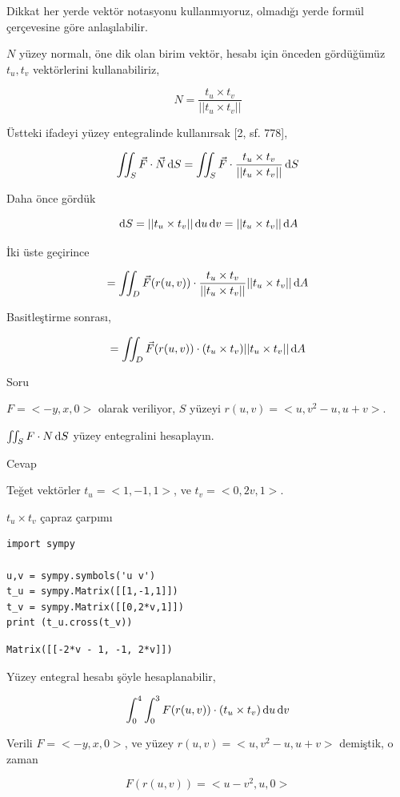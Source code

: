 \documentclass[12pt,fleqn]{article}\usepackage{../../common}
\begin{document}
Dikkat her yerde vektör notasyonu kullanmıyoruz, olmadığı yerde formül
çerçevesine göre anlaşılabilir.

$N$ yüzey normalı, öne dik olan birim vektör, hesabı için önceden gördüğümüz
$t_u,t_v$ vektörlerini kullanabiliriz,

$$
N = \frac{t_u \times t_v}{ || t_u \times t_v || }
$$

Üstteki ifadeyi yüzey entegralinde kullanırsak [2, sf. 778],

$$
\iint_S \vec{F} \cdot \vec{N} \,\mathrm{d} S =
\iint_S \vec{F} \cdot \frac{t_u \times t_v}{ || t_u \times t_v || } \,\mathrm{d} S
$$

Daha önce gördük

$$
\,\mathrm{d} S = || t_u \times t_v || \,\mathrm{d} u \,\mathrm{d} v = || t_u \times t_v || \,\mathrm{d} A
$$

İki üste geçirince

$$
= \iint_D \vec{F}(r(u,v)) \cdot \frac{t_u \times t_v}{ || t_u \times t_v || }
|| t_u \times t_v || \,\mathrm{d} A
$$

Basitleştirme sonrası,

$$
= \iint_D \vec{F}(r(u,v)) \cdot (t_u \times t_v) || t_u \times t_v || \,\mathrm{d} A
$$

Soru

$F = < -y, x, 0 >$ olarak veriliyor, $S$ yüzeyi $r(u,v) = < u, v^2 - u, u+v >$.

$\iint_S F \cdot N \,\mathrm{d} S$ yüzey entegralini hesaplayın.

Cevap

Teğet vektörler $t_u = < 1, -1, 1 >$, ve $t_v = < 0, 2v, 1 >$.

$t_u \times t_v$ çapraz çarpımı

\begin{verbatim}
import sympy

u,v = sympy.symbols('u v')
t_u = sympy.Matrix([[1,-1,1]])
t_v = sympy.Matrix([[0,2*v,1]])
print (t_u.cross(t_v))
\end{verbatim}

\begin{verbatim}
Matrix([[-2*v - 1, -1, 2*v]])
\end{verbatim}

Yüzey entegral hesabı şöyle hesaplanabilir,

$$
\int _{0}^{4} \int _{0}^{3} F(r(u,v)) \cdot (t_u \times t_v) \,\mathrm{d} u \,\mathrm{d} v
$$

Verili $F = < -y, x, 0 >$, ve yüzey $r(u,v) = < u, v^2 - u, u+v >$ demiştik,
o zaman 

$$
F(r(u,v)) = < u-v^2, u, 0 > 
$$
\end{document}
